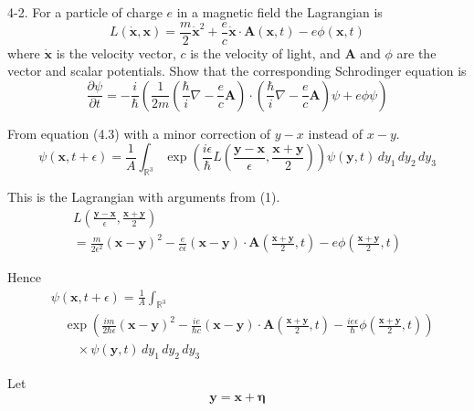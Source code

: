 \documentclass[12pt]{article}
\newcommand\INT{\int_{\mathbb R^3}}
\begin{document}
4-2.
For a particle of charge $e$ in a magnetic field the Lagrangian is
\begin{equation*}
L(\dot{\mathbf x},\mathbf x)=\frac{m}{2}\dot{\mathbf x}^2
+\frac{e}{c}\dot{\mathbf x}\cdot\mathbf A(\mathbf x,t)-e\phi(\mathbf x,t)
\end{equation*}
where $\dot{\mathbf x}$ is the velocity vector,
$c$ is the velocity of light, and $\mathbf A$ and $\phi$
are the vector and scalar potentials.
Show that the corresponding Schrodinger equation is
\begin{equation*}
\frac{\partial\psi}{\partial t}
=-\frac{i}{\hbar}\left(
\frac{1}{2m}\left(\frac{\hbar}{i}\nabla-\frac{e}{c}\mathbf A\right)
\cdot
\left(\frac{\hbar}{i}\nabla-\frac{e}{c}\mathbf A\right)\psi
+e\phi\psi
\right)
\tag{4.18}
\end{equation*}

From equation (4.3) with a minor correction of $y-x$ instead of $x-y$.
\begin{equation*}
\psi(\mathbf x,t+\epsilon)=\frac{1}{A}\INT\exp\left(
\frac{i\epsilon}{\hbar}L\left(\frac{\mathbf y-\mathbf x}{\epsilon},\frac{\mathbf x+\mathbf y}{2}\right)
\right)\psi(\mathbf y,t)
\,dy_1\,dy_2\,dy_3
\tag{1}
\end{equation*}

This is the Lagrangian with arguments from (1).
\begin{multline*}
L\left(\frac{\mathbf y-\mathbf x}{\epsilon},\frac{\mathbf x+\mathbf y}{2}\right)
\\
=\frac{m}{2\epsilon^2}(\mathbf x-\mathbf y)^2
-\frac{e}{c\epsilon}(\mathbf x-\mathbf y)\cdot\mathbf A\left(\frac{\mathbf x+\mathbf y}{2},t\right)
-e\phi\left(\frac{\mathbf x+\mathbf y}{2},t\right)
\end{multline*}

Hence
\begin{align*}
&\psi(\mathbf x,t+\epsilon)=\frac{1}{A}\INT
\\
&\quad\exp
\left(
\frac{im}{2\hbar\epsilon}(\mathbf x-\mathbf y)^2
-\frac{ie}{\hbar c}(\mathbf x-\mathbf y)\cdot\mathbf A\left(\frac{\mathbf x+\mathbf y}{2},t\right)
-\frac{ie\epsilon}{\hbar}\phi\left(\frac{\mathbf x+\mathbf y}{2},t\right)
\right)
\\
&\quad\quad{}\times\psi(\mathbf y,t)
\,dy_1\,dy_2\,dy_3
\end{align*}

Let
\begin{equation*}
\mathbf y=\mathbf x+\boldsymbol\eta
\end{equation*}
\end{document}

